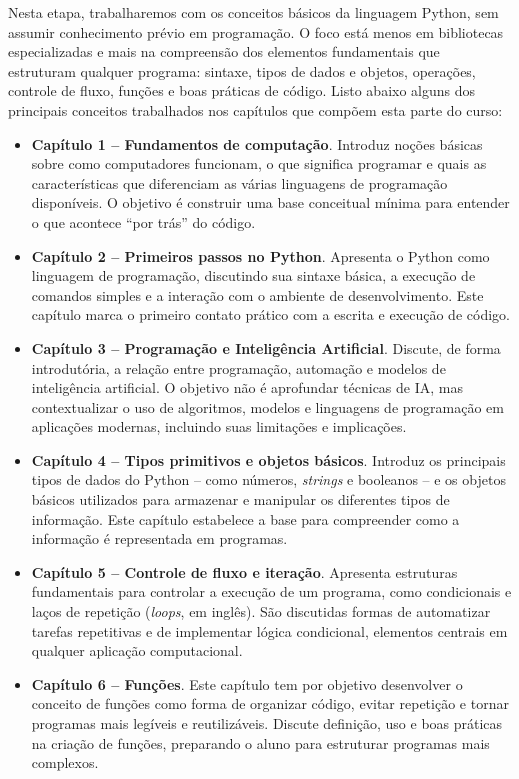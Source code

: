 \documentclass[
  brazilian,
  letterpaper,
  DIV=11,
  numbers=noendperiod]{scrreprt}
\begin{document}
Nesta etapa, trabalharemos com os conceitos básicos da linguagem Python,
sem assumir conhecimento prévio em programação. O foco está menos em
bibliotecas especializadas e mais na compreensão dos elementos
fundamentais que estruturam qualquer programa: sintaxe, tipos de dados e
objetos, operações, controle de fluxo, funções e boas práticas de
código. Listo abaixo alguns dos principais conceitos trabalhados nos
capítulos que compõem esta parte do curso:

\begin{itemize}
\item
  \textbf{Capítulo 1 -- Fundamentos de computação}. Introduz noções
  básicas sobre como computadores funcionam, o que significa programar e
  quais as características que diferenciam as várias linguagens de
  programação disponíveis. O objetivo é construir uma base conceitual
  mínima para entender o que acontece ``por trás'' do código.
\item
  \textbf{Capítulo 2 -- Primeiros passos no Python}. Apresenta o Python
  como linguagem de programação, discutindo sua sintaxe básica, a
  execução de comandos simples e a interação com o ambiente de
  desenvolvimento. Este capítulo marca o primeiro contato prático com a
  escrita e execução de código.
\item
  \textbf{Capítulo 3 -- Programação e Inteligência Artificial}. Discute,
  de forma introdutória, a relação entre programação, automação e
  modelos de inteligência artificial. O objetivo não é aprofundar
  técnicas de IA, mas contextualizar o uso de algoritmos, modelos e
  linguagens de programação em aplicações modernas, incluindo suas
  limitações e implicações.
\item
  \textbf{Capítulo 4 -- Tipos primitivos e objetos básicos}. Introduz os
  principais tipos de dados do Python -- como números, \emph{strings} e
  booleanos -- e os objetos básicos utilizados para armazenar e
  manipular os diferentes tipos de informação. Este capítulo estabelece
  a base para compreender como a informação é representada em programas.
\item
  \textbf{Capítulo 5 -- Controle de fluxo e iteração}. Apresenta
  estruturas fundamentais para controlar a execução de um programa, como
  condicionais e laços de repetição (\emph{loops}, em inglês). São
  discutidas formas de automatizar tarefas repetitivas e de implementar
  lógica condicional, elementos centrais em qualquer aplicação
  computacional.
\item
  \textbf{Capítulo 6 -- Funções}. Este capítulo tem por objetivo
  desenvolver o conceito de funções como forma de organizar código,
  evitar repetição e tornar programas mais legíveis e reutilizáveis.
  Discute definição, uso e boas práticas na criação de funções,
  preparando o aluno para estruturar programas mais complexos.
\end{itemize}
\end{document}
